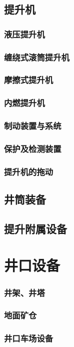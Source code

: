 \documentclass[UTF8]{../../ApplicationUniverse}
\begin{document}
    \subsection{提升机}
        \subsubsection{液压提升机}
        \subsubsection{缠绕式滚筒提升机}
        \subsubsection{摩擦式提升机}
        \subsubsection{内燃提升机}
        \subsubsection{制动装置与系统}
        \subsubsection{保护及检测装置}
        \subsubsection{提升机的拖动}
    \subsection{井筒装备}
    \subsection{提升附属设备}
\section{井口设备}
    \subsubsection{井架、井塔}
    \subsubsection{地面矿仓}
    \subsubsection{井口车场设备}
\end{document}

